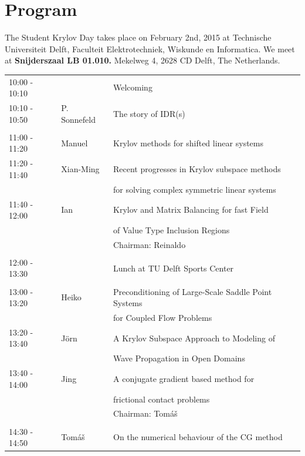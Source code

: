 \documentclass{article}
\begin{document}
\newpage
\section*{Program}
The Student Krylov Day takes place on February 2nd, 2015 at Technische Universiteit Delft, 
    Faculteit Elektrotechniek, Wiskunde en Informatica. We meet at \textbf{Snijderszaal LB 01.010.}
Mekelweg 4, 2628 CD Delft, The Netherlands. \\ 
\begin{table}[h]
\begin{tabular}{lll}
10:00 - 10:10 &  & Welcoming \\ [0.5ex]
10:10 - 10:50 & P. Sonnefeld & The story of IDR(s) \\ [0.5ex]
\hline \\ [-1.5ex]
11:00 - 11:20 & Manuel & Krylov methods for shifted linear systems \\ [0.5ex]
11:20 - 11:40 & Xian-Ming & Recent progresses in Krylov subspace methods\\ 
                        & & for solving complex symmetric linear systems\\  [0.5ex]
11:40 - 12:00 & Ian & Krylov and Matrix Balancing for fast Field \\ 
              &     & of Value Type Inclusion Regions\\  [0.5ex]
& & \hfill \small{Chairman: Reinaldo }  \\
\hline \\ [-1.5ex]
12:00 - 13:30 & & Lunch at TU Delft Sports Center \\ [0.5ex]
\hline \\ [-1.5ex]
13:00 - 13:20 & Heiko & Preconditioning of Large-Scale Saddle Point Systems\\
                    & & for Coupled Flow Problems\\ [0.5ex]
13:20 - 13:40 &J\"orn & A Krylov Subspace Approach to Modeling of \\
                     & & Wave Propagation in Open Domains\\ [0.5ex]
13:40 - 14:00 & Jing & A conjugate gradient based method for \\
                   & & frictional contact problems\\ [0.5ex]
& & \hfill \small{Chairman: Tom{\'a}{\v s}} \\
\hline \\ [-1.5ex]
14:30 - 14:50 & Tom{\'a}{\v s} & On the numerical behaviour of the CG method\\ [0.5ex]

\end{tabular}
\end{table}
\end{document}
